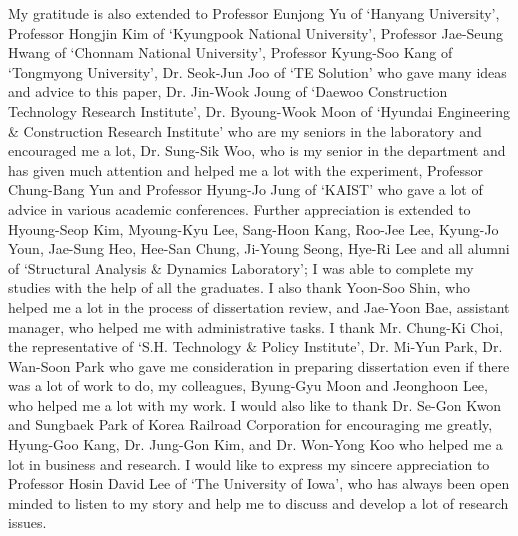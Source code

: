 My gratitude is also extended to Professor Eunjong Yu of `Hanyang University', Professor Hongjin Kim of `Kyungpook National University', Professor Jae-Seung Hwang of `Chonnam National University', Professor Kyung-Soo Kang of `Tongmyong University', Dr. Seok-Jun Joo of `TE Solution' who gave many ideas and advice to this paper, Dr. Jin-Wook Joung of `Daewoo Construction Technology Research Institute', Dr. Byoung-Wook Moon of `Hyundai Engineering \& Construction Research Institute' who are my seniors in the laboratory and encouraged me a lot, Dr. Sung-Sik Woo, who is my senior in the department and has given much attention and helped me a lot with the experiment, Professor Chung-Bang Yun and Professor Hyung-Jo Jung of `KAIST' who gave a lot of advice in various academic conferences. Further appreciation is extended to Hyoung-Seop Kim, Myoung-Kyu Lee, Sang-Hoon Kang, Roo-Jee Lee, Kyung-Jo Youn, Jae-Sung Heo, Hee-San Chung, Ji-Young Seong, Hye-Ri Lee and all alumni of `Structural Analysis \& Dynamics Laboratory'; I was able to complete my studies with the help of all the graduates. I also thank Yoon-Soo Shin, who helped me a lot in the process of dissertation review, and Jae-Yoon Bae, assistant manager, who helped me with administrative tasks. I thank Mr. Chung-Ki Choi, the representative of `S.H. Technology \& Policy Institute', Dr. Mi-Yun Park, Dr. Wan-Soon Park who gave me consideration in preparing dissertation even if there was a lot of work to do, my colleagues, Byung-Gyu Moon and Jeonghoon Lee, who helped me a lot with my work. I would also like to thank Dr. Se-Gon Kwon and Sungbaek Park of Korea Railroad Corporation for encouraging me greatly, Hyung-Goo Kang, Dr. Jung-Gon Kim, and Dr. Won-Yong Koo who helped me a lot in business and research. I would like to express my sincere appreciation to Professor Hosin David Lee of `The University of Iowa', who has always been open minded to listen to my story and help me to discuss and develop a lot of research issues.


